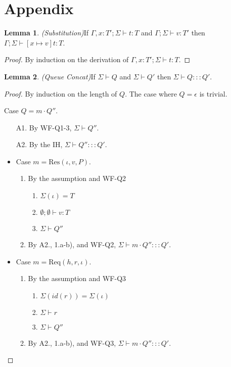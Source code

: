 \documentclass{article}
\theoremstyle{definition}
\newtheorem{lem}{Lemma}[section]
\newcommand{\Req}[3]{\text{Req}(#1, #2, #3)}
\newcommand{\ResP}[3]{\text{Res}(#1, #2, #3)}
\begin{document}
\newpage
\section{Appendix}

\begin{lem}
\emph{(Substitution)}\label{th:subst}
If $\Gamma , x : T' ; \Sigma \vdash t : T$ and $\Gamma ; \Sigma \vdash v : T'$ then $\Gamma ; \Sigma \vdash [x \mapsto v]t : T$.
\end{lem}
\begin{proof}
By induction on the derivation of $\Gamma , x : T' ; \Sigma \vdash t : T$.
\end{proof}

\begin{lem}
\emph{(Queue Concat)}\label{lem:queue-concat}
If $\Sigma \vdash Q$ and $\Sigma \vdash Q'$ then $\Sigma \vdash Q ::: Q'$.
\end{lem}
\begin{proof}
By induction on the length of $Q$. The case where $Q = \epsilon$ is trivial.

Case $Q = m \cdot Q''$.
\begin{enumerate}
\item[A1.] By WF-Q1-3, $\Sigma \vdash Q''$.
\item[A2.] By the IH, $\Sigma \vdash Q'' ::: Q'$.
\end{enumerate}

\begin{itemize}
\item Case $m = {\ResP \iota v P}$.
\begin{enumerate}
\item By the assumption and WF-Q2
  \begin{enumerate}[label=(\alph*)]
  \item $\Sigma(\iota) = T$
  \item $\emptyset ; \emptyset \vdash v : T$
  \item $\Sigma \vdash Q''$
  \end{enumerate}
\item By A2., 1.a-b), and WF-Q2, $\Sigma \vdash m \cdot Q'' ::: Q'$.
\end{enumerate}

\item Case $m = {\Req h r \iota}$.
\begin{enumerate}
\item By the assumption and WF-Q3
  \begin{enumerate}[label=(\alph*)]
  \item $\Sigma(id(r)) = \Sigma(\iota)$
  \item $\Sigma \vdash r$
  \item $\Sigma \vdash Q''$
  \end{enumerate}
\item By A2., 1.a-b), and WF-Q3, $\Sigma \vdash m \cdot Q'' ::: Q'$.
\end{enumerate}
\end{itemize}
\end{proof}
\end{document}
